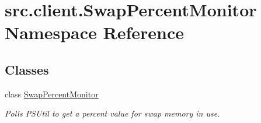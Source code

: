 \hypertarget{namespacesrc_1_1client_1_1_swap_percent_monitor}{\section{src.\-client.\-Swap\-Percent\-Monitor Namespace Reference}
\label{namespacesrc_1_1client_1_1_swap_percent_monitor}
}
\subsection*{Classes}
\begin{DoxyCompactItemize}
\item 
class \hyperlink{classsrc_1_1client_1_1_swap_percent_monitor_1_1_swap_percent_monitor}{Swap\-Percent\-Monitor}
\begin{DoxyCompactList}\small\item\em Polls P\-S\-Util to get a percent value for swap memory in use. \end{DoxyCompactList}\end{DoxyCompactItemize}

